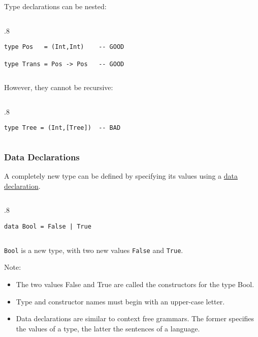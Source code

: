 \documentclass{beamer}
\newenvironment{codeblock}[1][.8]{%
\begin{columns}
\begin{column}{#1\linewidth}
\begin{exampleblock}{}}{%
\end{exampleblock}
\end{column}
\end{columns}}
\def\slideskip{\vskip 0.1in}
\begin{document}
\begin{frame}[fragile]
\Large

Type declarations can be nested:

\slideskip

\begin{codeblock}
\begin{verbatim}
type Pos   = (Int,Int)    -- GOOD

type Trans = Pos -> Pos   -- GOOD
\end{verbatim}
\end{codeblock}

\slideskip
However, they cannot be recursive:
\slideskip

\begin{codeblock}
\begin{verbatim}
type Tree = (Int,[Tree])  -- BAD
\end{verbatim}
\end{codeblock}

\end{frame}

\begin{frame}[fragile]
\LARGE

\frametitle{Data Declarations}

A completely new type can be defined by specifying 
its values using a \underline{data declaration}. 

\slideskip

\begin{codeblock}
\begin{verbatim}
data Bool = False | True
\end{verbatim}
\end{codeblock}

\slideskip
{\tt Bool} is a new type, with two 
new values {\tt False} and {\tt True}.

\end{frame}

\begin{frame}[fragile]
\LARGE

Note: 
\begin{itemize}
\item The two values False and True are called the 
constructors for the type Bool. 
\item Type and constructor names must begin with 
an upper-case letter. 
\item Data declarations are similar to context free 
grammars.  The former specifies the values of 
a type, the latter the sentences of a language.
\end{itemize}
\end{frame}
\end{document}
